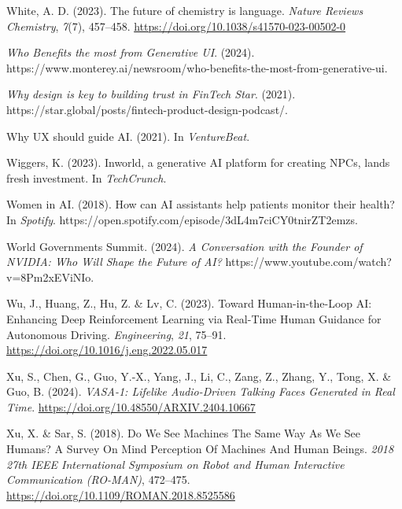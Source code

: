 \documentclass[
  letterpaper,
  DIV=11,
  numbers=noendperiod]{scrartcl}
\newlength{\cslhangindent}
\newenvironment{CSLReferences}[2] %
 {\begin{list}{}{%
  \setlength{\itemindent}{0pt}
  \setlength{\leftmargin}{0pt}
  \setlength{\parsep}{0pt}
  \ifodd #1
   \setlength{\leftmargin}{\cslhangindent}
   \setlength{\itemindent}{-1\cslhangindent}
  \fi
  \setlength{\itemsep}{#2\baselineskip}}}
 {\end{list}}
\begin{document}
\begin{CSLReferences}{1}{0}
White, A. D. (2023). The future of chemistry is language. \emph{Nature
Reviews Chemistry}, \emph{7}(7), 457--458.
\url{https://doi.org/10.1038/s41570-023-00502-0}

\emph{Who {Benefits} the most from {Generative UI}}. (2024).
https://www.monterey.ai/newsroom/who-benefits-the-most-from-generative-ui.

\emph{Why design is key to building trust in {FinTech} {\textbar}
{Star}}. (2021).
https://star.global/posts/fintech-product-design-podcast/.

Why {UX} should guide {AI}. (2021). In \emph{VentureBeat}.

Wiggers, K. (2023). Inworld, a generative {AI} platform for creating
{NPCs}, lands fresh investment. In \emph{TechCrunch}.

Women in AI. (2018). How can {AI} assistants help patients monitor their
health? In \emph{Spotify}.
https://open.spotify.com/episode/3dL4m7ciCY0tnirZT2emzs.

World Governments Summit. (2024). \emph{A {Conversation} with the
{Founder} of {NVIDIA}: {Who Will Shape} the {Future} of {AI}?}
https://www.youtube.com/watch?v=8Pm2xEViNIo.

Wu, J., Huang, Z., Hu, Z. \& Lv, C. (2023). Toward {Human-in-the-Loop
AI}: {Enhancing Deep Reinforcement Learning} via {Real-Time Human
Guidance} for {Autonomous Driving}. \emph{Engineering}, \emph{21},
75--91. \url{https://doi.org/10.1016/j.eng.2022.05.017}

Xu, S., Chen, G., Guo, Y.-X., Yang, J., Li, C., Zang, Z., Zhang, Y.,
Tong, X. \& Guo, B. (2024). \emph{{VASA-1}: {Lifelike Audio-Driven
Talking Faces Generated} in {Real Time}}.
\url{https://doi.org/10.48550/ARXIV.2404.10667}

Xu, X. \& Sar, S. (2018). Do {We See Machines The Same Way As We See
Humans}? {A Survey On Mind Perception Of Machines And Human Beings}.
\emph{2018 27th {IEEE International Symposium} on {Robot} and {Human
Interactive Communication} ({RO-MAN})}, 472--475.
\url{https://doi.org/10.1109/ROMAN.2018.8525586}


\end{CSLReferences}
\end{document}
